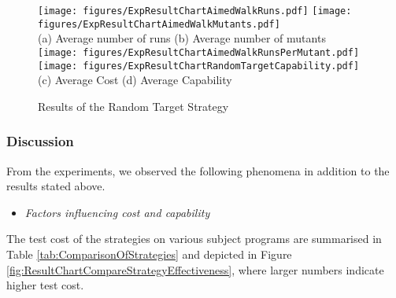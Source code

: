 \documentclass[preprint,1p,authoryear,times]{elsarticle}
\begin{document}
\begin{figure}[htbp]
	\centering
	\texttt{[image: figures/ExpResultChartAimedWalkRuns.pdf]}
	\texttt{[image: figures/ExpResultChartAimedWalkMutants.pdf]}\\
	\scriptsize{(a) Average number of runs \hspace{2cm} (b) Average number of mutants}\\			
	\texttt{[image: figures/ExpResultChartAimedWalkRunsPerMutant.pdf]}
	\texttt{[image: figures/ExpResultChartRandomTargetCapability.pdf]}\\
	\scriptsize{(c) Average Cost \hspace{3cm} (d) Average Capability} 
	\caption{Results of the Random Target Strategy}
	\label{fig:AimedWalkResultChart}
\end{figure}

\subsubsection{Discussion} \label{sec:Discussion}

From the experiments, we observed the following phenomena in addition to the results stated above. 

\begin{itemize}
\item \emph{Factors influencing cost and capability}
\end{itemize}

The test cost of the strategies on various subject programs are summarised in Table \ref{tab:ComparisonOfStrategies} and depicted in Figure \ref{fig:ResultChartCompareStrategyEffectiveness}, where larger numbers indicate higher test cost. 

\end{document}
